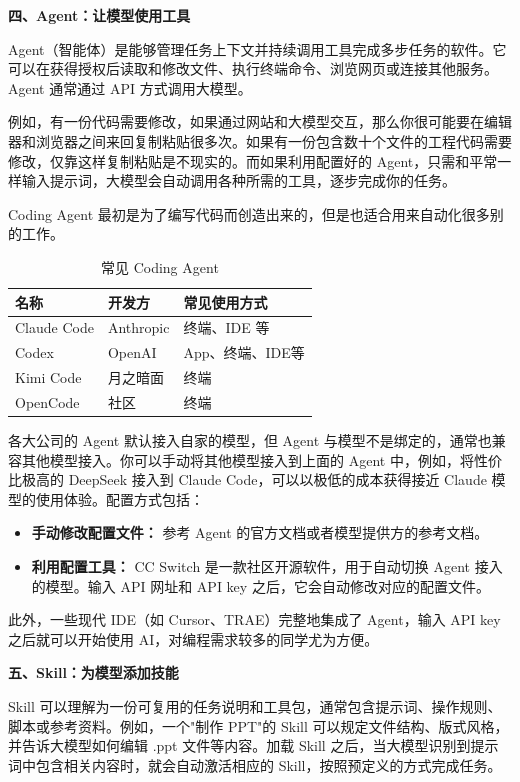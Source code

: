 \documentclass[11pt,oneside]{book}
\begin{document}
\textbf{四、Agent：让模型使用工具}

Agent（智能体）是能够管理任务上下文并持续调用工具完成多步任务的软件。它可以在获得授权后读取和修改文件、执行终端命令、浏览网页或连接其他服务。Agent 通常通过 API 方式调用大模型。

例如，有一份代码需要修改，如果通过网站和大模型交互，那么你很可能要在编辑器和浏览器之间来回复制粘贴很多次。如果有一份包含数十个文件的工程代码需要修改，仅靠这样复制粘贴是不现实的。而如果利用配置好的 Agent，只需和平常一样输入提示词，大模型会自动调用各种所需的工具，逐步完成你的任务。

Coding Agent 最初是为了编写代码而创造出来的，但是也适合用来自动化很多别的工作。

\begin{table}[htbp]
\centering
\begin{tabular}{lll}
\hline
名称 & 开发方 & 常见使用方式 \\
\hline
Claude Code & Anthropic & 终端、IDE 等 \\
Codex & OpenAI & App、终端、IDE等 \\
Kimi Code & 月之暗面 & 终端 \\
OpenCode & 社区 & 终端 \\
\hline
\end{tabular}
\caption{常见 Coding Agent}
\end{table}

各大公司的 Agent 默认接入自家的模型，但 Agent 与模型不是绑定的，通常也兼容其他模型接入。你可以手动将其他模型接入到上面的 Agent 中，例如，将性价比极高的 DeepSeek 接入到 Claude Code，可以以极低的成本获得接近 Claude 模型的使用体验。配置方式包括：

\begin{itemize}
    \item \textbf{手动修改配置文件：} 参考 Agent 的官方文档或者模型提供方的参考文档。
    \item \textbf{利用配置工具：} CC Switch 是一款社区开源软件，用于自动切换 Agent 接入的模型。输入 API 网址和 API key 之后，它会自动修改对应的配置文件。
\end{itemize}

此外，一些现代 IDE（如 Cursor、TRAE）完整地集成了 Agent，输入 API key 之后就可以开始使用 AI，对编程需求较多的同学尤为方便。

\vspace{10pt}

\textbf{五、Skill：为模型添加技能}

Skill 可以理解为一份可复用的任务说明和工具包，通常包含提示词、操作规则、脚本或参考资料。例如，一个"制作 PPT"的 Skill 可以规定文件结构、版式风格，并告诉大模型如何编辑 .ppt 文件等内容。加载 Skill 之后，当大模型识别到提示词中包含相关内容时，就会自动激活相应的 Skill，按照预定义的方式完成任务。
\end{document}
